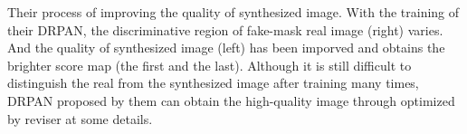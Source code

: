 \documentclass[10pt,twocolumn,letterpaper]{article}
\begin{document}
Their process of improving the quality of synthesized image. With the training of their DRPAN, the discriminative region of fake-mask real image (right) varies. And the quality of synthesized image (left) has been imporved and obtains the brighter score map (the first and the last). Although it is still difficult to distinguish the real from the synthesized image after training many times, DRPAN proposed by them can obtain the high-quality image through optimized by reviser at some details.

{\small


}
\end{document}
